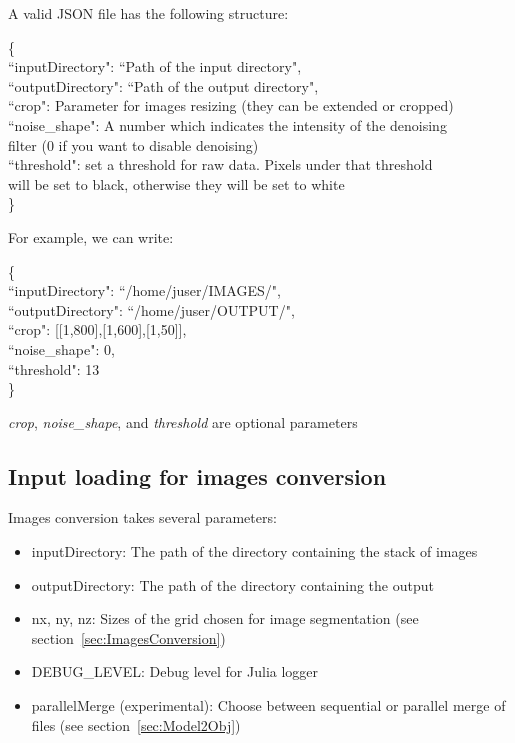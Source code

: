 \documentclass[11pt,oneside]{article}	%
\begin{document}
A valid JSON file has the following structure:
\begin{tabbing}
\{ \= \\
\>  ``inputDirectory": ``Path of the input directory",\\
\>  ``outputDirectory": ``Path of the output directory",\\
\>  ``crop": Parameter for images resizing (they can be extended or cropped)\\
\>  ``noise\_shape": A number which indicates the intensity of the denoising \\
filter (0 if you want to disable denoising)\\
\>  ``threshold": set a threshold for raw data. Pixels under that threshold \\
will be set to black, otherwise they will be set to white\\
\}\\
\end{tabbing}

For example, we can write:

\begin{tabbing}
\{ \= \\
\>  ``inputDirectory": ``/home/juser/IMAGES/",\\
\>  ``outputDirectory": ``/home/juser/OUTPUT/",\\
\>  ``crop": [[1,800],[1,600],[1,50]],\\
\>  ``noise\_shape": 0,\\
\>  ``threshold": 13\\
\}\\
\end{tabbing}

\textit{crop}, \textit{noise\_shape}, and \textit{threshold} are optional parameters

\subsection{Input loading for images conversion}\label{sec:input}

Images conversion takes several parameters:

\begin{itemize}
 \item inputDirectory: The path of the directory containing the stack of images
 \item outputDirectory: The path of the directory containing the output
 \item nx, ny, nz: Sizes of the grid chosen for image segmentation (see section~\ref{sec:ImagesConversion})
 \item DEBUG\_LEVEL: Debug level for Julia logger
 \item parallelMerge (experimental): Choose between sequential or parallel merge of files (see section~\ref{sec:Model2Obj})
\end{itemize}
\end{document}

